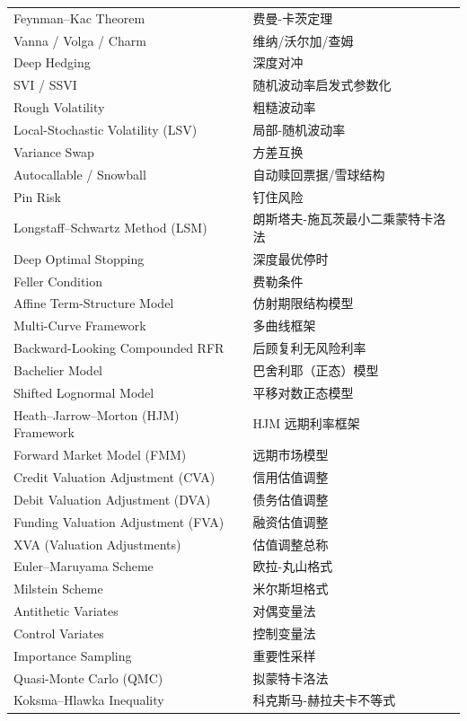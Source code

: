 \begin{longtable}{ll}
    Feynman--Kac Theorem & 费曼-卡茨定理 \\
    Vanna / Volga / Charm & 维纳/沃尔加/查姆 \\
    Deep Hedging & 深度对冲 \\
    SVI / SSVI & 随机波动率启发式参数化 \\
    Rough Volatility & 粗糙波动率 \\
    Local-Stochastic Volatility (LSV) & 局部-随机波动率 \\
    Variance Swap & 方差互换 \\
    Autocallable / Snowball & 自动赎回票据/雪球结构 \\
    Pin Risk & 钉住风险 \\
    Longstaff--Schwartz Method (LSM) & 朗斯塔夫-施瓦茨最小二乘蒙特卡洛法 \\
    Deep Optimal Stopping & 深度最优停时 \\
    Feller Condition & 费勒条件 \\
    Affine Term-Structure Model & 仿射期限结构模型 \\
    Multi-Curve Framework & 多曲线框架 \\
    Backward-Looking Compounded RFR & 后顾复利无风险利率 \\
    Bachelier Model & 巴舍利耶（正态）模型 \\
    Shifted Lognormal Model & 平移对数正态模型 \\
    Heath--Jarrow--Morton (HJM) Framework & HJM 远期利率框架 \\
    Forward Market Model (FMM) & 远期市场模型 \\
    Credit Valuation Adjustment (CVA) & 信用估值调整 \\
    Debit Valuation Adjustment (DVA) & 债务估值调整 \\
    Funding Valuation Adjustment (FVA) & 融资估值调整 \\
    XVA (Valuation Adjustments) & 估值调整总称 \\
    Euler--Maruyama Scheme & 欧拉-丸山格式 \\
    Milstein Scheme & 米尔斯坦格式 \\
    Antithetic Variates & 对偶变量法 \\
    Control Variates & 控制变量法 \\
    Importance Sampling & 重要性采样 \\
    Quasi-Monte Carlo (QMC) & 拟蒙特卡洛法 \\
    Koksma--Hlawka Inequality & 科克斯马-赫拉夫卡不等式 \\
\end{longtable}
